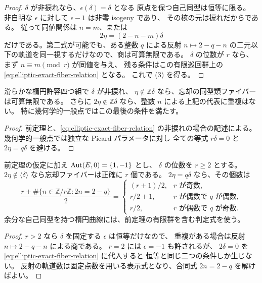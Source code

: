 \begin{proof}
$\delta$ が非捩れなら、$\epsilon(\delta)=\delta$ となる
原点を保つ自己同型は恒等に限る。
非自明な $\epsilon$ に対して $\epsilon-1$ は非零 isogeny であり、
その核の元は捩れだからである。
従って同値関係は $n=m$、または
\[
 2\eta=(2-n-m)\delta
\]
だけである。第二式が可能でも、ある整数 $q$ による反射
$n\mapsto 2-q-n$ の二元以下の軌道を同一視するだけなので、商は可算無限である。
$\delta$ の位数が $r$ なら、まず $n\equiv m\pmod r$ が同値を与え、
残る条件はこの有限巡回群上の \eqref{eq:elliptic-exact-fiber-relation} となる。
これで (3) を得る。
\end{proof}

\begin{corollary}[一般楕円型における忘却の可算無限ファイバー]
\label{thm:generic-elliptic-unpointed-fiber}
滑らかな楕円許容四つ組で $\delta$ が非捩れ、
$\eta\notin\mathbb Z\delta$ なら、忘却の同型類ファイバーは可算無限である。
さらに $2\eta\notin\mathbb Z\delta$ なら、整数 $n$ による上記の代表に重複はない。
特に幾何学的一般点ではこの最後の条件を満たす。
\end{corollary}
\begin{proof}
前定理と、\eqref{eq:elliptic-exact-fiber-relation} の非捩れの場合の記述による。
幾何学的一般点では独立な Picard パラメータに対し
全ての等式 $r\delta=0$ と $2\eta=q\delta$ を避ける。
\end{proof}

\begin{corollary}[余分な楕円自己同型がない捩れの場合の濃度]
\label{cor:elliptic-torsion-fiber-cardinality}
前定理の仮定に加え $\operatorname{Aut}(E,0)=\{1,-1\}$ とし、
$\delta$ の位数を $r\ge2$ とする。
$2\eta\notin\langle\delta\rangle$ なら忘却ファイバーは正確に $r$ 個である。
$2\eta=q\delta$ なら、その個数は
\[
 \frac{r+\#\{n\in\mathbb Z/r\mathbb Z:2n=2-q\}}2
 =\begin{cases}
   (r+1)/2,&r\text{ が奇数},\\
   r/2+1,&r\text{ が偶数で }q\text{ が偶数},\\
   r/2,&r\text{ が偶数で }q\text{ が奇数}.
  \end{cases}
\]
余分な自己同型を持つ楕円曲線には、前定理の有限群を含む判定式を使う。
\end{corollary}
\begin{proof}
$r>2$ なら $\delta$ を固定する $\epsilon$ は恒等だけなので、
重複がある場合は反射 $n\mapsto2-q-n$ による商である。
$r=2$ には $\epsilon=-1$ も許されるが、
$2\delta=0$ を \eqref{eq:elliptic-exact-fiber-relation} に代入すると
恒等と同じ二つの条件しか生じない。
反射の軌道数は固定点数を用いる表示式となり、合同式 $2n=2-q$ を解けばよい。
\end{proof}

